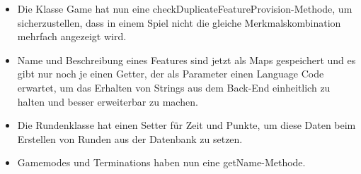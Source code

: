 \documentclass[a4paper]{scrreprt}
\begin{document}
\begin{itemize}
	\item Die Klasse Game hat nun eine checkDuplicateFeatureProvision-Methode, um sicherzustellen, dass in einem Spiel nicht die gleiche Merkmalskombination mehrfach angezeigt wird.
	\item Name und Beschreibung eines Features sind jetzt als Maps gespeichert und es gibt nur noch je einen Getter, der als Parameter einen Language Code erwartet, um das Erhalten von Strings aus dem Back-End einheitlich zu halten und besser erweiterbar zu machen.
	\item Die Rundenklasse hat einen Setter für Zeit und Punkte, um diese Daten beim Erstellen von Runden aus der Datenbank zu setzen.
	\item Gamemodes und Terminations haben nun eine getName-Methode.
	
\end{itemize}
\end{document}

